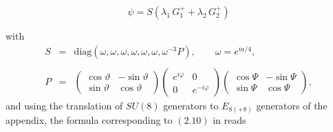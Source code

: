 \documentclass[a4paper,12pt]{article}
\begin{document}
\begin{equation}
\label{ManifoldSpinorsSix}
\psi=S\left(\lambda_1\,G_1^+ + \lambda_2\,G_2^+\right)
\end{equation}

\vfill\break

with
\begin{equation}
\begin{array}{lll}
S&=&\mbox{diag}\left(\omega,\omega,\omega,\omega,\omega,\omega,\omega^{-3}P\right),\qquad \omega=e^{ia/4},\\
&&\\
P&=&
\left(\begin{array}{rr}\cos\vartheta&-\sin\vartheta\\ \sin\vartheta&\cos\vartheta\end{array}\right)
\left(\begin{array}{rr}e^{i\varphi}&0\\0&e^{-i\varphi}\end{array}\right)
\left(\begin{array}{rr}\cos\Psi&-\sin\Psi\\\sin\Psi&\cos\Psi\end{array}\right),
\end{array}
\end{equation}
and using the translation of $SU(8)$ generators to $E_{8(+8)}$
generators of the appendix, the formula corresponding to $(2.10)$ in
\cite{Warner:vz} reads%
%
\end{document}

